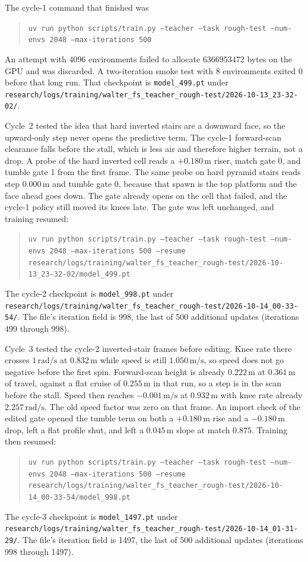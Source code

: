 \documentclass[11pt]{article}
\begin{document}
The cycle-1 command that finished was
\begin{quote}
\texttt{uv run python scripts/train.py --teacher --task rough-test --num-envs 2048 --max-iterations 500}
\end{quote}
An attempt with 4096 environments failed to allocate \(6366953472\) bytes on the GPU and was discarded.
A two-iteration smoke test with 8 environments exited 0 before that long run.
That checkpoint is \texttt{model\_499.pt} under \texttt{research/logs/training/walter\_fs\_teacher\_rough-test/2026-10-13\_23-32-02/}.

Cycle~2 tested the idea that hard inverted stairs are a downward face, so the upward-only step never opens the predictive term.
The cycle-1 forward-scan clearance falls before the stall, which is less air and therefore higher terrain, not a drop.
A probe of the hard inverted cell reads a \(+0.180\,\mathrm{m}\) riser, match gate 0, and tumble gate 1 from the first frame.
The same probe on hard pyramid stairs reads step \(0.000\,\mathrm{m}\) and tumble gate 0, because that spawn is the top platform and the face ahead goes down.
The gate already opens on the cell that failed, and the cycle-1 policy still moved its knees late.
The gate was left unchanged, and training resumed:
\begin{quote}
\texttt{uv run python scripts/train.py --teacher --task rough-test --num-envs 2048 --max-iterations 500 --resume research/logs/training/walter\_fs\_teacher\_rough-test/2026-10-13\_23-32-02/model\_499.pt}
\end{quote}
The cycle-2 checkpoint is \texttt{model\_998.pt} under \texttt{research/logs/training/walter\_fs\_teacher\_rough-test/2026-10-14\_00-33-54/}.
The file's iteration field is 998, the last of 500 additional updates (iterations 499 through 998).

Cycle~3 tested the cycle-2 inverted-stair frames before editing.
Knee rate there crosses \(1\,\mathrm{rad/s}\) at \(0.832\,\mathrm{m}\) while speed is still \(1.050\,\mathrm{m/s}\), so speed does not go negative before the first spin.
Forward-scan height is already \(0.222\,\mathrm{m}\) at \(0.361\,\mathrm{m}\) of travel, against a flat cruise of \(0.255\,\mathrm{m}\) in that run, so a step is in the scan before the stall.
Speed then reaches \(-0.001\,\mathrm{m/s}\) at \(0.932\,\mathrm{m}\) with knee rate already \(2.257\,\mathrm{rad/s}\).
The old speed factor was zero on that frame.
An import check of the edited gate opened the tumble term on both a \(+0.180\,\mathrm{m}\) rise and a \(-0.180\,\mathrm{m}\) drop, left a flat profile shut, and left a \(0.045\,\mathrm{m}\) slope at match \(0.875\).
Training then resumed:
\begin{quote}
\texttt{uv run python scripts/train.py --teacher --task rough-test --num-envs 2048 --max-iterations 500 --resume research/logs/training/walter\_fs\_teacher\_rough-test/2026-10-14\_00-33-54/model\_998.pt}
\end{quote}
The cycle-3 checkpoint is \texttt{model\_1497.pt} under \texttt{research/logs/training/walter\_fs\_teacher\_rough-test/2026-10-14\_01-31-29/}.
The file's iteration field is 1497, the last of 500 additional updates (iterations 998 through 1497).
\end{document}
